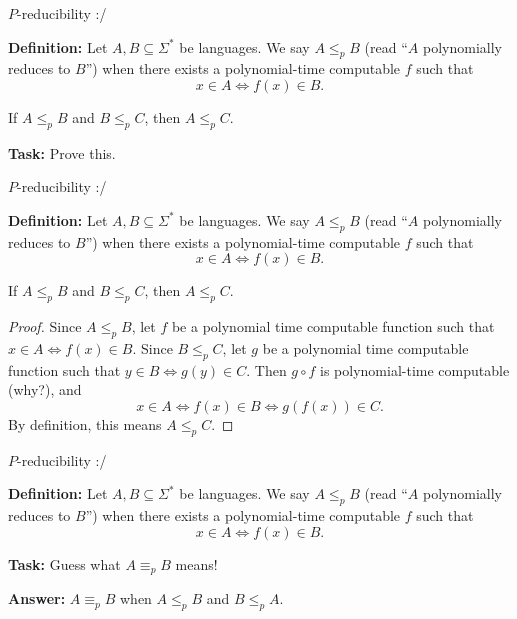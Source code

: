 \documentclass{beamer}
\begin{document}
\begin{frame}{$P$-reducibility :/} 

\textbf{Definition:} Let $A, B \subseteq \Sigma^*$ be languages. We say $A \leq_p B$ (read ``$A$ polynomially reduces to $B$'') when there exists a polynomial-time computable $f$ such that
$$x \in A \Leftrightarrow f(x) \in B.$$

\begin{theorem}
If $A \leq_p B$ and $B \leq_p C$, then $A \leq_p C$. 
\end{theorem}

\textbf{Task:} Prove this. 

\end{frame}

\begin{frame}{$P$-reducibility :/} 

\textbf{Definition:} Let $A, B \subseteq \Sigma^*$ be languages. We say $A \leq_p B$ (read ``$A$ polynomially reduces to $B$'') when there exists a polynomial-time computable $f$ such that
$$x \in A \Leftrightarrow f(x) \in B.$$

\begin{theorem}
If $A \leq_p B$ and $B \leq_p C$, then $A \leq_p C$. 
\end{theorem}
\begin{proof}
Since $A \leq_p B$, let $f$ be a polynomial time computable function such that
$x \in A \Leftrightarrow f(x) \in B$. Since $B \leq_p C$, let $g$ be a polynomial time computable function such that $y \in B \Leftrightarrow g(y) \in C$.
Then $g \circ f$ is polynomial-time computable (why?), and
$$x \in A \Leftrightarrow f(x) \in B \Leftrightarrow g(f(x)) \in C.$$
By definition, this means $A \leq_p C$.
\end{proof}

\end{frame}

\begin{frame}{$P$-reducibility :/} 

\textbf{Definition:} Let $A, B \subseteq \Sigma^*$ be languages. We say $A \leq_p B$ (read ``$A$ polynomially reduces to $B$'') when there exists a polynomial-time computable $f$ such that
$$x \in A \Leftrightarrow f(x) \in B.$$

\textbf{Task:} Guess what $A \equiv_p B$ means!

\pause

\textbf{Answer:} $A \equiv_p B$ when $A \leq_p B$ and $B \leq_p A$.

\end{frame}
\end{document}

